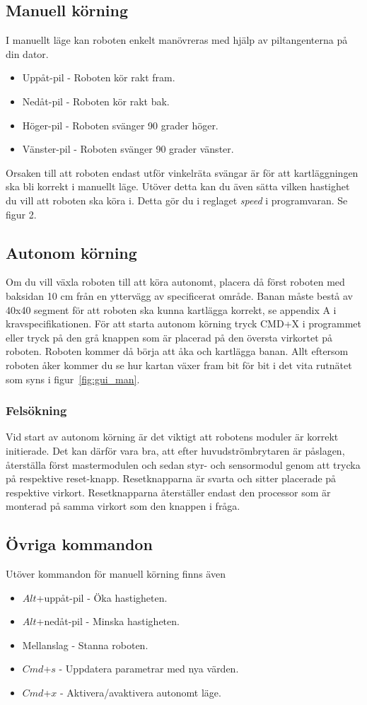 \documentclass[a4paper,12pt,fleqn]{article}
\begin{document}
\subsection*{Manuell körning}
I manuellt läge kan roboten enkelt manövreras med hjälp av piltangenterna på din dator.
\begin{itemize}
	\item Uppåt-pil - Roboten kör rakt fram.
	\item Nedåt-pil - Roboten kör rakt bak.
	\item Höger-pil - Roboten svänger 90 grader höger.
	\item Vänster-pil - Roboten svänger 90 grader vänster.
\end{itemize}
Orsaken till att roboten endast utför vinkelräta svängar är för att kartläggningen ska bli korrekt i manuellt läge. Utöver detta kan du även sätta vilken hastighet du vill att roboten ska köra i. Detta gör du i reglaget \emph{speed} i programvaran. Se figur 2. 
	
\subsection*{Autonom körning}
Om du vill växla roboten till att köra autonomt, placera då först roboten med baksidan 10 cm från en yttervägg av specificerat område. Banan måste bestå av 40x40 segment för att roboten ska kunna kartlägga korrekt, se appendix A i kravspecifikationen. För att starta autonom körning tryck CMD+X i programmet eller tryck på den grå knappen som är placerad på den översta virkortet på roboten. Roboten kommer då börja att åka och kartlägga banan. Allt eftersom roboten åker kommer du se hur kartan växer fram bit för bit i det vita rutnätet som syns i figur~\ref{fig:gui_man}. 

\subsubsection*{Felsökning}
Vid start av autonom körning är det viktigt att robotens moduler är korrekt initierade. Det kan därför vara bra, att efter huvudströmbrytaren är påslagen, återställa först mastermodulen och sedan styr- och sensormodul genom att trycka på respektive reset-knapp. Resetknapparna är svarta och sitter placerade på respektive virkort. Resetknapparna återställer endast den processor som är monterad på samma virkort som den knappen i fråga.

\subsection*{Övriga kommandon}
Utöver kommandon för manuell körning finns även
\begin{itemize}
	\item $Alt$+uppåt-pil - Öka hastigheten.
	\item $Alt$+nedåt-pil - Minska hastigheten.
	\item Mellanslag - Stanna roboten.
	\item $Cmd$+$s$ - Uppdatera parametrar med nya värden.
	\item $Cmd$+$x$ - Aktivera/avaktivera autonomt läge.
\end{itemize}
\newpage
\end{document}
